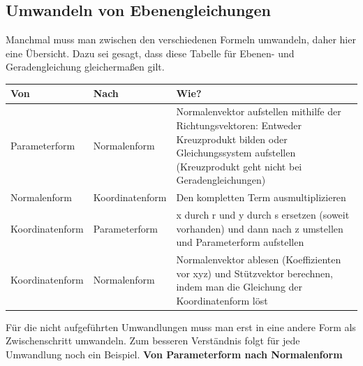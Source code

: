 \documentclass[12pt]{article}
\begin{document}
		\subsection{Umwandeln von Ebenengleichungen}
		\noindent Manchmal muss man zwischen den verschiedenen Formeln umwandeln, daher hier eine Übersicht. Dazu sei gesagt, dass diese Tabelle für Ebenen- und Geradengleichung gleichermaßen gilt.
		\begin{center}
			\bgroup
			\def\arraystretch{1.75}
			\begin{tabularx}{\textwidth}{|l|l|X|}
				\hline
				\textbf{Von} & \textbf{Nach} & \textbf{Wie?} \\ \hline
				Parameterform & Normalenform & Normalenvektor aufstellen mithilfe der Richtungsvektoren: Entweder Kreuzprodukt bilden oder Gleichungssystem aufstellen (Kreuzprodukt geht nicht bei Geradengleichungen) \\ \hline
				Normalenform & Koordinatenform & Den kompletten Term ausmultiplizieren \\ \hline
				Koordinatenform & Parameterform & x durch r und y durch s ersetzen (soweit vorhanden) und dann nach z umstellen und Parameterform aufstellen \\ \hline
				Koordinatenform & Normalenform & Normalenvektor ablesen (Koeffizienten vor xyz) und Stützvektor berechnen, indem man die Gleichung der Koordinatenform löst \\
				\hline
			\end{tabularx}
			\egroup
		\end{center}
		Für die nicht aufgeführten Umwandlungen muss man erst in eine andere Form als Zwischenschritt umwandeln. Zum besseren Verständnis folgt für jede Umwandlung noch ein Beispiel.\newline\newline
		\textbf{Von Parameterform nach Normalenform}
\end{document}
